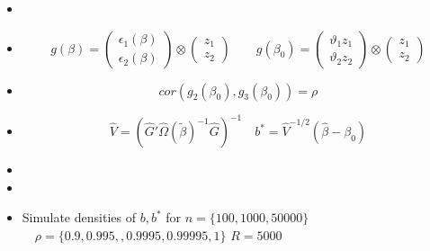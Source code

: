 \documentclass{beamer}
\begin{document}
\begin{frame}
\begin{itemize}
\item[] \item[]\begin{equation*}  g(\beta)= \left(\begin{array}{c} \epsilon_{1}(\beta) \\  \epsilon_{2}(\beta) \end{array}\right) \otimes \left(\begin{array}{c} z_1 \\ z_2 \end{array} \right) \qquad  g(\beta_0)=\left(\begin{array}{c} \vartheta_{1}z_1 \\  \vartheta_{2}z_2 \end{array}\right) \otimes \left(\begin{array}{c} z_1 \\ z_2 \end{array} \right) \end{equation*}
\item[] \begin{equation*} cor(g_2(\beta_0),g_3(\beta_0))=\rho \end{equation*}
   \vspace{10pt}
\item[] \begin{equation*} \hat{V}=(\hat{G}'\hat{\Omega}(\tilde{\beta})^{-1}\hat{G})^{-1} \quad b^*=\hat{V}^{-1/2}(\hat{\beta}-\beta_0)\end{equation*}
            \vspace{10pt}
        \item[] 
        \vspace{10pt}
        \item[]

           \vspace{10pt}
          \item[] Simulate densities of $b,b^*$ for  $n=\{100,1000,50000\}$  $\quad\rho=\{0.9,0.995,,0.9995, 0.99995,1\}$ $R=5000$

 \end{itemize}
 \end{frame}
\end{document}
